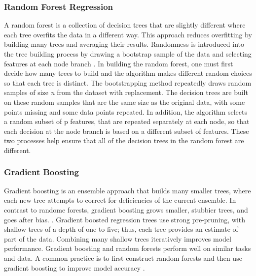 \documentclass[sigconf]{acmart}
\begin{document}
\subsubsection{Random Forest Regression}

A random forest is a collection of decision trees that are slightly different 
where each tree overfits the data in a different way. This approach reduces 
overfitting by building many trees and averaging their results. Randomness is 
introduced into the tree building process by drawing a bootstrap sample of the 
data and selecting features at each node branch \cite{muller17,raschka17}. 
In building the random forest, one must first decide how many trees to build  
and the algorithm makes different random choices so that each tree is distinct. 
The bootstrapping method repeatedly draws random samples of size \textit{n} 
from the dataset with replacement. The decision trees are built on these 
random samples that are the same size as the original data, with some points 
missing and some data points repeated. In addition, the algorithm selects a 
random subset of p features, that are repeated separately at each node, so 
that each decision at the node branch is based on a different subset of 
features. These two processes help ensure that all of the decision trees in 
the random forest are different. 


\subsubsection{Gradient Boosting}

Gradient boosting is an ensemble approach that builds many smaller trees,  
where each new tree attempts to correct for deficiencies of the current 
ensemble. In contrast to randome forests, gradient boosting grows smaller, 
stubbier trees, and goes after bias. \cite{jamesetal13, kuhn13}. Gradient 
boosted regression trees use strong pre-pruning, with shallow trees of a 
depth of one to five; thus, each tree provides an estimate of part of the 
data. Combining many shallow trees iteratively improves model performance. 
Gradient boosting and random forests perform well on similar tasks and data. 
A common practice is to first construct random forests and then use gradient 
boosting to improve model accuracy \cite{muller17}. 
\end{document}
